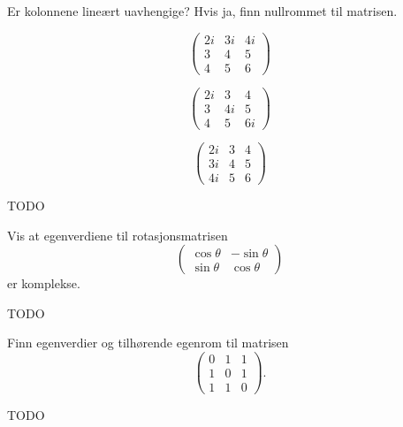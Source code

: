 
\begin{oppgave}
Er kolonnene lineært uavhengige? Hvis ja, finn nullrommet til matrisen.
\begin{punkt}
\[
\begin{pmatrix}
2i & 3i & 4i \\ 3 & 4 & 5 \\ 4 & 5 & 6 
\end{pmatrix}
\]
\end{punkt}

\begin{punkt}
\[
\begin{pmatrix}
2i & 3 & 4 \\ 3 & 4i & 5 \\ 4 & 5 & 6i 
\end{pmatrix}
\]
\end{punkt}

\begin{punkt}
\[
\begin{pmatrix}
2i & 3 & 4 \\ 3i & 4 & 5 \\ 4i & 5 & 6 
\end{pmatrix}
\]
\end{punkt}
\end{oppgave}

\begin{losning}
TODO
\end{losning}


\begin{oppgave}
Vis at egenverdiene til rotasjonsmatrisen
\[
\begin{pmatrix}
\cos \theta & -\sin \theta  \\ \sin \theta & \cos \theta  
\end{pmatrix}
\]
er komplekse.
\end{oppgave}

\begin{losning}
TODO
\end{losning}

\begin{oppgave}
Finn egenverdier og tilhørende egenrom til matrisen 
\[
\begin{pmatrix}
0 & 1 & 1 \\ 1 & 0 & 1 \\ 1 & 1 & 0 
\end{pmatrix}.
\]
\end{oppgave}

\begin{losning}
TODO
\end{losning}

